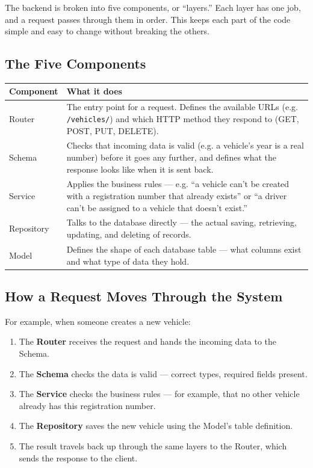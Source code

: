 \documentclass[11pt,a4paper]{article}
\begin{document}
The backend is broken into five components, or ``layers.'' Each layer has one job, and a request passes through them in order. This keeps each part of the code simple and easy to change without breaking the others.

\subsection{The Five Components}

\begin{table}[H]
\centering
\begin{tabularx}{\textwidth}{|p{3cm}|X|}
\hline
\textbf{Component} & \textbf{What it does} \\
\hline
Router & The entry point for a request. Defines the available URLs (e.g. \texttt{/vehicles/}) and which HTTP method they respond to (GET, POST, PUT, DELETE). \\
\hline
Schema & Checks that incoming data is valid (e.g. a vehicle's year is a real number) before it goes any further, and defines what the response looks like when it is sent back. \\
\hline
Service & Applies the business rules --- e.g. ``a vehicle can't be created with a registration number that already exists'' or ``a driver can't be assigned to a vehicle that doesn't exist.'' \\
\hline
Repository & Talks to the database directly --- the actual saving, retrieving, updating, and deleting of records. \\
\hline
Model & Defines the shape of each database table --- what columns exist and what type of data they hold. \\
\hline
\end{tabularx}
\end{table}

\subsection{How a Request Moves Through the System}

For example, when someone creates a new vehicle:
\begin{enumerate}
    \item The \textbf{Router} receives the request and hands the incoming data to the Schema.
    \item The \textbf{Schema} checks the data is valid --- correct types, required fields present.
    \item The \textbf{Service} checks the business rules --- for example, that no other vehicle already has this registration number.
    \item The \textbf{Repository} saves the new vehicle using the Model's table definition.
    \item The result travels back up through the same layers to the Router, which sends the response to the client.
\end{enumerate}
\end{document}
